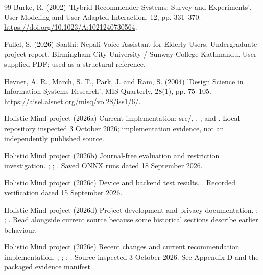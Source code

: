 \begin{thebibliography}{99}
Burke, R. (2002) 'Hybrid Recommender Systems: Survey and Experiments', User Modeling and User-Adapted Interaction, 12, pp. 331--370. \url{https://doi.org/10.1023/A:1021240730564}.

Fullel, S. (2026) Saathi: Nepali Voice Assistant for Elderly Users. Undergraduate project report, Birmingham City University /\allowbreak{} Sunway College Kathmandu. User-supplied PDF; used as a structural reference.

Hevner, A. R., March, S. T., Park, J. and Ram, S. (2004) 'Design Science in Information Systems Research', MIS Quarterly, 28(1), pp. 75--105. \url{https://aisel.aisnet.org/misq/vol28/iss1/6/}.

Holistic Mind project (2026a) Current implementation: src/\allowbreak{}, , , and . Local repository inspected 3 October 2026; implementation evidence, not an independently published source.

Holistic Mind project (2026b) Journal-free evaluation and restriction investigation. ; ; . Saved ONNX runs dated 18 September 2026.

Holistic Mind project (2026c) Device and backend test results. . Recorded verification dated 15 September 2026.

Holistic Mind project (2026d) Project development and privacy documentation. ; ; . Read alongside current source because some historical sections describe earlier behaviour.

Holistic Mind project (2026e) Recent changes and current recommendation implementation. ; ; ; . Source inspected 3 October 2026. See Appendix D and the packaged evidence manifest.


\end{thebibliography}
